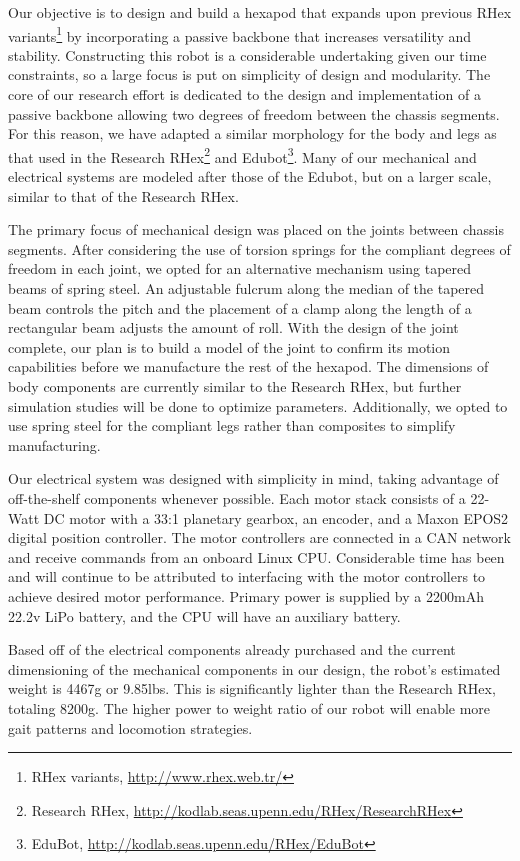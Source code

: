 \documentclass[11pt]{article}
\begin{document}
Our objective is to design and build a hexapod that expands upon previous RHex variants\footnote{RHex variants, \url{http://www.rhex.web.tr/}} by incorporating a passive backbone that increases versatility and stability. Constructing this robot is a considerable undertaking given our time constraints, so a large focus is put on simplicity of design and modularity. The core of our research effort is dedicated to the design and implementation of a passive backbone allowing two degrees of freedom between the chassis segments. For this reason, we have adapted a similar morphology for the body and legs as that used in the Research RHex\footnote{Research RHex, \url{http://kodlab.seas.upenn.edu/RHex/ResearchRHex}} and Edubot\footnote{EduBot, \url{http://kodlab.seas.upenn.edu/RHex/EduBot}}. Many of our mechanical and electrical systems are modeled after those of the Edubot, but on a larger scale, similar to that of the Research RHex.

The primary focus of mechanical design was placed on the joints between chassis segments. After considering the use of torsion springs for the compliant degrees of freedom in each joint, we opted for an alternative mechanism using tapered beams of spring steel. An adjustable fulcrum along the median of the tapered beam controls the pitch and the placement of a clamp along the length of a rectangular beam adjusts the amount of roll. With the design of the joint complete, our plan is to build a model of the joint to confirm its motion capabilities before we manufacture the rest of the hexapod. The dimensions of body components are currently similar to the Research RHex, but further simulation studies will be done to optimize parameters. Additionally, we opted to use spring steel for the compliant legs rather than composites to simplify manufacturing.

Our electrical system was designed with simplicity in mind, taking advantage of off-the-shelf components whenever possible. Each motor stack consists of a 22-Watt DC motor with a 33:1 planetary gearbox, an encoder, and a Maxon EPOS2 digital position controller. The motor controllers are connected in a CAN network and receive commands from an onboard Linux CPU. Considerable time has been and will continue to be attributed to interfacing with the motor controllers to achieve desired motor performance. Primary power is supplied by a 2200mAh 22.2v LiPo battery, and the CPU will have an auxiliary battery.

Based off of the electrical components already purchased and the current dimensioning of the mechanical components in our design, the robot's estimated weight is 4467g or 9.85lbs. This is significantly lighter than the Research RHex, totaling 8200g. The higher power to weight ratio of our robot will enable more gait patterns and locomotion strategies.
\end{document}
